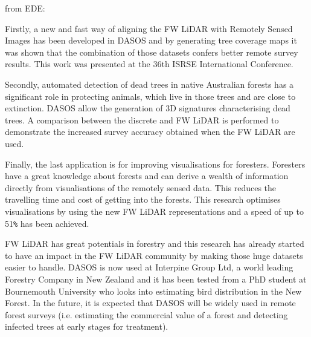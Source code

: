 \documentclass{subfiles}
\begin{document}
	
	\par from EDE:
	
	\par Firstly, a new and fast way of aligning the FW LiDAR with Remotely Sensed Images has been developed in DASOS and by generating tree coverage maps it was shown that the combination of those datasets confers better remote survey results.  This work was presented at the 36th ISRSE International Conference. 
	
	\par Secondly, automated detection of dead trees in native Australian forests has a significant role in protecting animals, which live in those trees and are close to extinction. DASOS allow the generation of 3D signatures characterising dead trees. A comparison between the discrete and FW LiDAR is performed to demonstrate the increased survey accuracy obtained when the FW LiDAR are used. 
	
	\par Finally, the last application is for improving visualisations for foresters. Foresters have a great knowledge about forests and can derive a wealth of information directly from visualisations of the remotely sensed data. This reduces the travelling time and cost of getting into the forests. This research optimises visualisations by using the new FW LiDAR representations and a speed of up to 51\verb|%| has been achieved.
	
	\par FW LiDAR has great potentials in forestry and this research has already started to have an impact in the FW LiDAR community by making those huge datasets easier to handle. DASOS is now used at Interpine Group Ltd, a world leading Forestry Company in New Zealand and it has been tested from a PhD student at Bournemouth University who looks into estimating bird distribution in the New Forest. In the future, it is expected that DASOS will be widely used in remote forest surveys (i.e. estimating the commercial value of a forest and detecting infected trees at early stages for treatment). 
	
	
\end{document}
